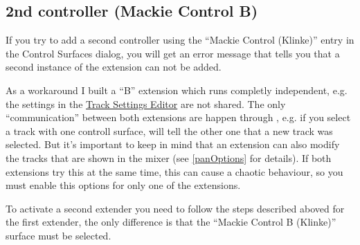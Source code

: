 \subsection{2nd controller (Mackie Control B)}\label{secondcontroller}
If you try to add a second controller using the ``Mackie Control
(Klinke)'' entry in the Control Surfaces dialog, you will get an
error message that tells you that a second instance of the extension
can not be added.

As a workaround I built a ``B'' extension which runs completly
independent, e.g. the settings in the
\hyperref[F:Screenshot_Track_Mode]{Track Settings Editor} are not
shared. The only ``communication'' between both extensions are happen
through \reaper, e.g. if you select a track with one controll surface,
\reaper will tell the other one that a new track was selected. But
it's important to keep in mind that an extension can also modify the
tracks that are shown in the \reaper mixer (see \ref{panOptions} for
details). If both extensions try this at the same time, this can cause
a chaotic behaviour, so you must enable this options for only one of
the extensions.

To activate a second extender you need to follow the steps described
aboved for the first extender, the only difference is that the
``Mackie Control B (Klinke)'' surface must be selected.
